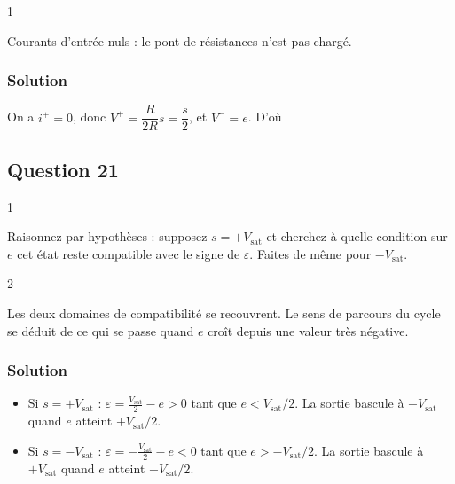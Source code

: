 \documentclass[11pt,a4paper]{article}
\providecommand{\tightlist}{\setlength{\itemsep}{0pt}\setlength{\parskip}{0pt}}
\newcommand{\equationajustee}[1]{%
  \sbox{\boiteequation}{$\displaystyle #1$}%
  \ifdim\wd\boiteequation>\linewidth
    \[\resizebox{\linewidth}{!}{\usebox{\boiteequation}}\]%
  \else
    \[#1\]%
  \fi}
\begin{document}
\begin{indication}{1}

Courants d'entrée nuls : le pont de résistances n'est pas chargé.

\end{indication}

\hypertarget{solution-19}{%
\subsubsection{Solution}\label{solution-19}}

On a \(i^+=0\), donc \(V^+=\dfrac{R}{2R}s=\dfrac s2\), et \(V^-=e\). D'où

\equationajustee{\boxed{\varepsilon=\frac s2-e}}

\hypertarget{question-21}{%
\subsection{Question 21}\label{question-21}}

\begin{indication}{1}

Raisonnez par hypothèses : supposez \(s=+V_{\text{sat}}\) et cherchez à quelle condition sur \(e\) cet état reste compatible avec le signe de \(\varepsilon\). Faites de même pour \(-V_{\text{sat}}\).

\end{indication}

\begin{indication}{2}

Les deux domaines de compatibilité se recouvrent. Le sens de parcours du cycle se déduit de ce qui se passe quand \(e\) croît depuis une valeur très négative.

\end{indication}

\hypertarget{solution-20}{%
\subsubsection{Solution}\label{solution-20}}

\begin{itemize}
\tightlist
\item
  Si \(s=+V_{\text{sat}}\) : \(\varepsilon=\frac{V_{\text{sat}}}2-e>0\) tant que \(e<V_{\text{sat}}/2\). La sortie bascule à \(-V_{\text{sat}}\) quand \(e\) atteint \(+V_{\text{sat}}/2\).
\item
  Si \(s=-V_{\text{sat}}\) : \(\varepsilon=-\frac{V_{\text{sat}}}2-e<0\) tant que \(e>-V_{\text{sat}}/2\). La sortie bascule à \(+V_{\text{sat}}\) quand \(e\) atteint \(-V_{\text{sat}}/2\).
\end{itemize}
\end{document}
